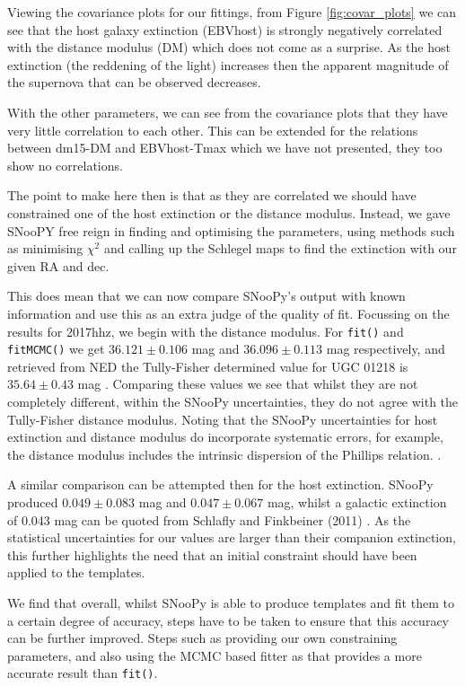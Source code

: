 \documentclass[twocolumn]{revtex4}
\begin{document}
Viewing the covariance plots for our fittings, from Figure \ref{fig:covar_plots} we can see that the host galaxy extinction (EBVhost) is strongly negatively correlated with the distance modulus (DM) which does not come as a surprise. As the host extinction (the reddening of the light) increases then the apparent magnitude of the supernova that can be observed decreases. 

With the other parameters, we can see from the covariance plots that they have very little correlation to each other. This can be extended for the relations between dm15-DM and EBVhost-Tmax which we have not presented, they too show no correlations.

The point to make here then is that as they are correlated we should have constrained one of the host extinction or the distance modulus. Instead, we gave SNooPY free reign in finding and optimising the parameters, using methods such as minimising $\chi^2$ and calling up the Schlegel maps to find the extinction with our given RA and dec. 

This does mean that we can now compare SNooPy's output with known information and use this as an extra judge of the quality of fit. Focussing on the results for 2017hhz, we begin with the distance modulus. For \texttt{fit()} and \texttt{fitMCMC()} we get $36.121\pm0.106$ mag and $36.096\pm0.113$ mag respectively, and retrieved from NED the Tully-Fisher determined value for UGC 01218 is $35.64\pm0.43$ mag \cite{tully_fish_catalogue}. Comparing these values we see that whilst they are not completely different, within the SNooPy uncertainties, they do not agree with the Tully-Fisher distance modulus. Noting that the SNooPy uncertainties for host extinction and distance modulus do incorporate systematic errors, for example, the distance modulus includes the intrinsic dispersion of the Phillips relation.  \cite{snoopy_online_docs}.

A similar comparison can be attempted then for the host extinction. SNooPy produced $0.049\pm0.083$ mag and $0.047\pm0.067$ mag, whilst a galactic extinction of 0.043 mag can be quoted from Schlafly and Finkbeiner (2011) \cite{reddening}. As the statistical uncertainties for our values are larger than their companion extinction, this further highlights the need that an initial constraint should have been applied to the templates.

We find that overall, whilst SNooPy is able to produce templates and fit them to a certain degree of accuracy, steps have to be taken to ensure that this accuracy can be further improved. Steps such as providing our own constraining parameters, and also using the MCMC based fitter as that provides a more accurate result than \texttt{fit()}.
\end{document}
